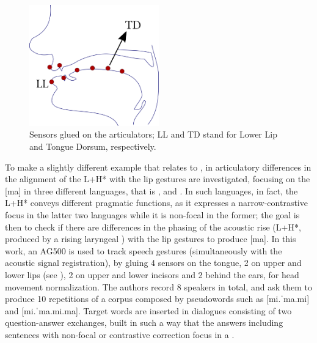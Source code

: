 \documentclass[output=paper]{langsci/langscibook}
\begin{document}
\begin{figure}[b]
\includegraphics[width=0.5\textwidth]{figures/GIL-img1.png}
\caption{Sensors glued on the articulators; LL and TD stand for Lower Lip and Tongue Dorsum, respectively.}
\label{fig:gil:1} 
\end{figure}
 
 
To make a slightly different example that relates to , in \citet{Stella2014} articulatory differences in the alignment of the L+H*  with the lip gestures are investigated, focusing on the  [ma] in three different languages, that is ,  and . In such languages, in fact, the L+H*  conveys different pragmatic functions, as it expresses a narrow-contrastive focus in the latter two languages while it is non-focal in the former; the goal is then to check if there are differences in the phasing of the acoustic rise (L+H*, produced by a rising laryngeal ) with the lip gestures to produce [ma]. In this work, an AG500  is used to track speech gestures (simultaneously with the acoustic signal registration), by gluing 4 sensors on the tongue, 2 on upper and lower lips (see ), 2 on upper and lower incisors and 2 behind the ears, for head movement normalization. The authors record 8 speakers in total, and ask them to produce 10 repetitions of a corpus composed by pseudowords such as [mi.ˈma.mi] and [mi.ˈma.mi.ma]. Target words are inserted in dialogues consisting of two question-answer exchanges, built in such a way that the answers including  sentences with non-focal or contrastive correction focus in a . 
\end{document}
